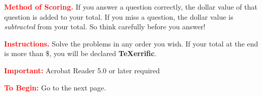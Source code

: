 \documentclass{jj_game} %
\begin{document}
\begin{instructions}
%
%
\textcolor{red}{\textbf{Method of Scoring.}} If you answer a
question correctly, the dollar value of that question is added to
your total.  If you miss a question, the dollar value is
\textit{subtracted} from your total.  So think carefully before
you answer!

\textcolor{red}{\textbf{Instructions.}} Solve the problems in
any order you wish. If your total at the end is more than \$\Goal,
you will be declared  \textbf{\TeX errific}.


\textcolor{red}{\textbf{Important:}} Acrobat Reader 5.0 or later required

\textcolor{red}{\textbf{To Begin:}} Go to the next page.

\end{instructions}
\end{document}

